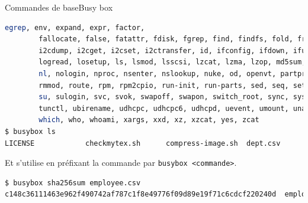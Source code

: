 \documentclass{beamer}
\begin{document}
    \begin{frame}[fragile]{Commandes de base}{Busy box}
        \begin{lstlisting}[language=bash,basicstyle=\tiny\ttfamily]
        egrep, env, expand, expr, factor,
        fallocate, false, fatattr, fdisk, fgrep, find, findfs, fold, free, freeramdisk, fsfreeze, fstrim, ftpget, ftpput, getopt, getty, grep, groups, gunzip, gzip, halt, head, hexdump, hostid, hostname, httpd, hwclock, i2cdetect,
        i2cdump, i2cget, i2cset, i2ctransfer, id, ifconfig, ifdown, ifup, init, insmod, ionice, ip, ipcalc, kill, killall, klogd, last, less, link, linux32, linux64, linuxrc, ln, loadfont, loadkmap, logger, login, logname,
        logread, losetup, ls, lsmod, lsscsi, lzcat, lzma, lzop, md5sum, mdev, microcom, mim, mkdir, mkdosfs, mke2fs, mkfifo, mknod, mkpasswd, mkswap, mktemp, modinfo, modprobe, more, mount, mt, mv, nameif, nbd-client, nc, netstat,
        nl, nologin, nproc, nsenter, nslookup, nuke, od, openvt, partprobe, passwd, paste, patch, pidof, ping, ping6, pivot_root, poweroff, printf, ps, pwd, rdate, readlink, realpath, reboot, renice, reset, resume, rev, rm, rmdir,
        rmmod, route, rpm, rpm2cpio, run-init, run-parts, sed, seq, setkeycodes, setpriv, setsid, sh, sha1sum, sha256sum, sha3sum, sha512sum, shred, shuf, sleep, sort, ssl_client, start-stop-daemon, stat, static-sh, strings, stty,
        su, sulogin, svc, svok, swapoff, swapon, switch_root, sync, sysctl, syslogd, tac, tail, tar, taskset, tc, tee, telnet, telnetd, test, tftp, time, timeout, top, touch, tr, traceroute, traceroute6, true, truncate, ts, tty,
        tunctl, ubirename, udhcpc, udhcpc6, udhcpd, uevent, umount, uname, uncompress, unexpand, uniq, unix2dos, unlink, unlzma, unshare, unxz, unzip, uptime, usleep, uudecode, uuencode, vconfig, vi, w, watch, watchdog, wc, wget,
        which, who, whoami, xargs, xxd, xz, xzcat, yes, zcat
$ busybox ls
LICENSE            checkmytex.sh      compress-image.sh  dept.csv           employee.csv       sqlite-hr.sh       venv
        \end{lstlisting}
        Et s'utilise en préfixant la commande par \lstinline{busybox <commande>}.
        \begin{lstlisting}[language=bash,basicstyle=\tiny\ttfamily]
$ busybox sha256sum employee.csv
c148c36111463e962f490742af787c1f8e49776f09d89e19f71c6cdcf220240d  employee.csv
        \end{lstlisting}
    \end{frame}
\end{document}
